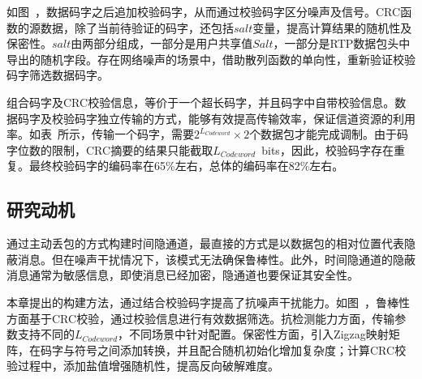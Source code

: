 如图\ ，数据码字之后追加校验码字，从而通过校验码字区分噪声及信号。CRC函数的源数据，除了当前待验证的码字，还包括$salt$变量，提高计算结果的随机性及保密性。$salt$由两部分组成，一部分是用户共享值$Salt$，一部分是RTP数据包头中导出的随机字段。存在网络噪声的场景中，借助散列函数的单向性，重新验证校验码字筛选数据码字。


组合码字及CRC校验信息，等价于一个超长码字，并且码字中自带校验信息。数据码字及校验码字独立传输的方式，能够有效提高传输效率，保证信道资源的利用率。如表\ 所示，传输一个码字，需要$2^{L_{Codeword}}\times 2$个数据包才能完成调制。由于码字位数的限制，CRC摘要的结果只能截取{$L_{Codeword}$\ bits}，因此，校验码字存在重复。最终校验码字的编码率在65\%左右，总体的编码率在82\%左右。

\subsection{研究动机}
\label{chap:zigzag:motivation:conclude}
通过主动丢包的方式构建时间隐通道，最直接的方式是以数据包的相对位置代表隐蔽消息。但在噪声干扰情况下，该模式无法确保鲁棒性。此外，时间隐通道的隐蔽消息通常为敏感信息，即使消息已经加密，隐通道也要保证其安全性。


本章提出的构建方法，通过结合校验码字提高了抗噪声干扰能力。如图\ ，鲁棒性方面基于CRC校验，通过校验信息进行有效数据筛选。抗检测能力方面，传输参数支持不同的$L_{Codeword}$，不同场景中针对配置。保密性方面，引入Zigzag映射矩阵，在码字与符号之间添加转换，并且配合随机初始化增加复杂度；计算CRC校验过程中，添加盐值增强随机性，提高反向破解难度。